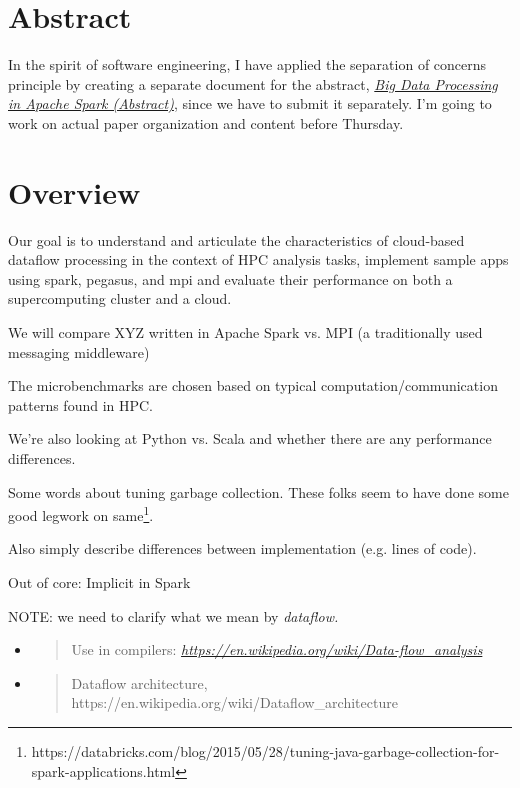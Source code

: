 \section{Abstract}\label{abstract}

In the spirit of software engineering, I have applied the separation of
concerns principle by creating a separate document for the abstract,
\href{http://drive.google.com/open?id=1lTxG_WOtMI6IbK3NU-cFe6LAKrQKN53Jn0MwpE7m3Xg}{\emph{Big
Data Processing in Apache Spark (Abstract)}}, since we have to submit it
separately. I'm going to work on actual paper organization and content
before Thursday.

\section{Overview}\label{overview}

Our goal is to understand and articulate the characteristics of
cloud-based dataflow processing in the context of HPC analysis tasks,
implement sample apps using spark, pegasus, and mpi and evaluate their
performance on both a supercomputing cluster and a cloud.

We will compare XYZ written in Apache Spark vs. MPI (a traditionally
used messaging middleware)

The microbenchmarks are chosen based on typical
computation/communication patterns found in HPC.

We're also looking at Python vs. Scala and whether there are any
performance differences.

Some words about tuning garbage collection. These folks seem to have
done some good legwork on same\footnote{https://databricks.com/blog/2015/05/28/tuning-java-garbage-collection-for-spark-applications.html}.

Also simply describe differences between implementation (e.g. lines of
code).

Out of core: Implicit in Spark

NOTE: we need to clarify what we mean by \emph{dataflow.}

\begin{itemize}
\item
  \begin{quote}
  Use in compilers:
  \href{https://en.wikipedia.org/wiki/Data-flow_analysis}{\emph{https://en.wikipedia.org/wiki/Data-flow\_analysis}}
  \end{quote}
\item
  \begin{quote}
  Dataflow architecture,
  https://en.wikipedia.org/wiki/Dataflow\_architecture
  \end{quote}
\end{itemize}


